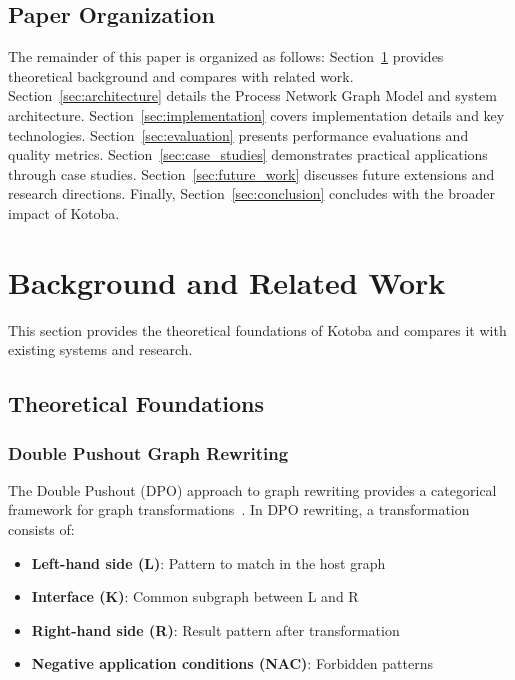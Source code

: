 \documentclass[11pt,a4paper]{article}
\begin{document}
\subsection{Paper Organization}
\label{subsec:organization}

The remainder of this paper is organized as follows: Section~\ref{sec:background} provides theoretical background and compares with related work. Section~\ref{sec:architecture} details the Process Network Graph Model and system architecture. Section~\ref{sec:implementation} covers implementation details and key technologies. Section~\ref{sec:evaluation} presents performance evaluations and quality metrics. Section~\ref{sec:case_studies} demonstrates practical applications through case studies. Section~\ref{sec:future_work} discusses future extensions and research directions. Finally, Section~\ref{sec:conclusion} concludes with the broader impact of Kotoba.

\section{Background and Related Work}
\label{sec:background}

This section provides the theoretical foundations of Kotoba and compares it with existing systems and research.

\subsection{Theoretical Foundations}
\label{subsec:theory}

\subsubsection{Double Pushout Graph Rewriting}
\label{subsubsec:dpo}

The Double Pushout (DPO) approach to graph rewriting provides a categorical framework for graph transformations~\cite{ehrig1973}. In DPO rewriting, a transformation consists of:

\begin{itemize}
\item \textbf{Left-hand side (L)}: Pattern to match in the host graph
\item \textbf{Interface (K)}: Common subgraph between L and R
\item \textbf{Right-hand side (R)}: Result pattern after transformation
\item \textbf{Negative application conditions (NAC)}: Forbidden patterns
\end{itemize}
\end{document}
